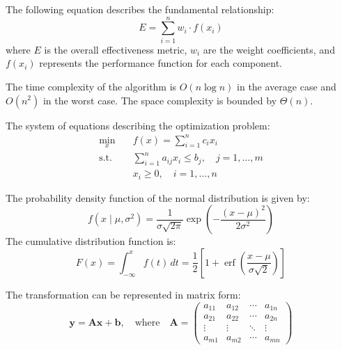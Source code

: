 The following equation describes the fundamental relationship:
\begin{equation}\label{eq:basic}
  E = \sum_{i=1}^{n} w_i \cdot f(x_i)
\end{equation}
where $E$ is the overall effectiveness metric, $w_i$ are the weight coefficients, and $f(x_i)$ represents the performance function for each component.

The time complexity of the algorithm is $O(n \log n)$ in the average case and $O(n^2)$ in the worst case.
The space complexity is bounded by $\Theta(n)$.

The system of equations describing the optimization problem:
\begin{align}
  \min_{x} \quad    & f(x) = \sum_{i=1}^{n} c_i x_i \label{eq:objective}                                 \\
  \text{s.t.} \quad & \sum_{i=1}^{n} a_{ij} x_i \leq b_j, \quad j = 1, \ldots, m \label{eq:constraint1} \\
                    & x_i \geq 0, \quad i = 1, \ldots, n \label{eq:constraint2}
\end{align}

The probability density function of the normal distribution is given by:
\begin{equation}\label{eq:normal}
  f(x \mid \mu, \sigma^2) = \frac{1}{\sigma\sqrt{2\pi}} \exp\left( -\frac{(x - \mu)^2}{2\sigma^2} \right)
\end{equation}
The cumulative distribution function is:
\begin{equation}\label{eq:cdf}
  F(x) = \int_{-\infty}^{x} f(t) \, dt
       = \frac{1}{2} \left[ 1 + \operatorname{erf}\left( \frac{x - \mu}{\sigma\sqrt{2}} \right) \right]
\end{equation}

The transformation can be represented in matrix form:
\begin{equation}\label{eq:matrix}
  \mathbf{y} = \mathbf{A} \mathbf{x} + \mathbf{b},
  \quad \text{where} \quad
  \mathbf{A} = \begin{pmatrix}
    a_{11} & a_{12} & \cdots & a_{1n} \\
    a_{21} & a_{22} & \cdots & a_{2n} \\
    \vdots & \vdots & \ddots & \vdots \\
    a_{m1} & a_{m2} & \cdots & a_{mn}
  \end{pmatrix}
\end{equation}

